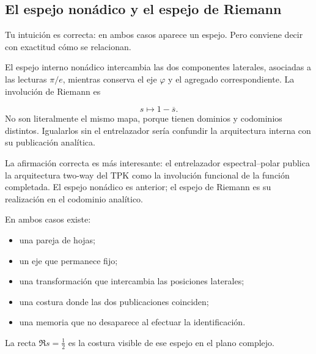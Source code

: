 \subsection{El espejo nonádico y el espejo de Riemann}
Tu intuición es correcta: en ambos casos aparece un espejo. Pero conviene decir con exactitud cómo se relacionan.\par
El espejo interno nonádico intercambia las dos componentes laterales, asociadas a las lecturas \(\pi/e\), mientras conserva el eje \(\varphi\) y el agregado correspondiente. La involución de Riemann es\par
\[
s\longmapsto1-\overline s.
\]
No son literalmente el mismo mapa, porque tienen dominios y codominios distintos. Igualarlos sin el entrelazador sería confundir la arquitectura interna con su publicación analítica.\par
La afirmación correcta es más interesante: el entrelazador espectral–polar publica la arquitectura two-way del TPK como la involución funcional de la función completada. El espejo nonádico es anterior; el espejo de Riemann es su realización en el codominio analítico.\par
En ambos casos existe:\par
\begin{itemize}
\item una pareja de hojas;
\item un eje que permanece fijo;
\item una transformación que intercambia las posiciones laterales;
\item una costura donde las dos publicaciones coinciden;
\item una memoria que no desaparece al efectuar la identificación.
\end{itemize}
La recta \(\Re s=\tfrac12\) es la costura visible de ese espejo en el plano complejo.\par
{}
